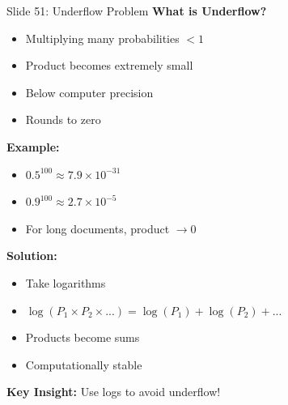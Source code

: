 \documentclass[8pt]{beamer}
\begin{document}
	\begin{frame}{Slide 51: Underflow Problem}
		\fontsize{6.5}{7.5}\selectfont
		\textbf{What is Underflow?}
		\begin{itemize}
			\item Multiplying many probabilities $< 1$
			\item Product becomes extremely small
			\item Below computer precision
			\item Rounds to zero
		\end{itemize}
		
		\vspace{0.1cm}
		\textbf{Example:}
		\begin{itemize}
			\item $0.5^{100} \approx 7.9 \times 10^{-31}$
			\item $0.9^{100} \approx 2.7 \times 10^{-5}$
			\item For long documents, product $\to 0$
		\end{itemize}
		
		\vspace{0.1cm}
		\textbf{Solution:}
		\begin{itemize}
			\item Take logarithms
			\item $\log(P_1 \times P_2 \times ...) = \log(P_1) + \log(P_2) + ...$
			\item Products become sums
			\item Computationally stable
		\end{itemize}
		
		\textcolor{myblue}{\textbf{Key Insight:}} Use logs to avoid underflow!
	\end{frame}
	
\end{document}
